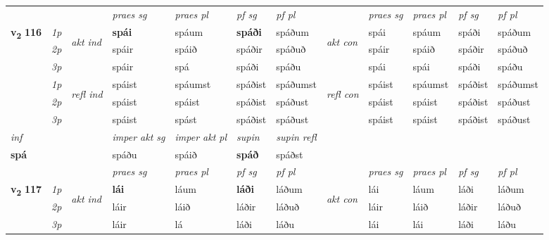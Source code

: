 \begin{longtable}[l]{X>{\footnotesize\itshape}llXXXXlXXXX}
 & &   & \textit{praes sg}  & \textit{praes pl}    & \textit{ pf sg} & \textit{pf pl} & & \textit{praes sg}  & \textit{praes pl}    & \textit{pf sg} & \textit{pf pl }  \\ \cmidrule{4-7} \cmidrule{9-12}
 \multirow{2}{*}{{{\textbf{v{\textsubscript{2}}} \Large{\textbf{116}}}}}  & 1p & \multirow{3}{*}{\begin{turn}{90}\textit{akt ind}\end{turn}} & \textbf{spái} & spáum & \textbf{spáði} & spáðum & \multirow{3}{*}{\begin{turn}{90}\textit{akt con}\end{turn}} &spái & spáum & spáði & spáðum\\*
 & 2p &  &  spáir  & spáið & spáðir & spáðuð & & spáir & spáið & spáðir & spáðuð \\*
 & 3p &  & spáir & spá & spáði & spáðu & & spái & spái& spáði & spáðu \\*
\cmidrule{4-7} \cmidrule{9-12}
 & 1p & \multirow{3}{*}{\begin{turn}{90}\textit{refl ind}\end{turn}}  & spáist & spáumst & spáðist & spáðumst & \multirow{3}{*}{\begin{turn}{90}\textit{refl con}\end{turn}}  &spáist & spáumst & spáðist & spáðumst \\*
 & 2p &  & spáist & spáist & spáðist & spáðust & &spáist & spáist & spáðist & spáðust \\*
 & 3p  & & spáist & spást & spáðist & spáðust & & spáist & spáist& spáðist & spáðust \\*
\cmidrule{4-7} \cmidrule{9-12}

   {\textit{inf}} & &  & \textit{imper akt sg} & \textit{imper akt pl}    & \textit{supin} & \textit{supin refl}  \\*
  {\textbf{spá}} & && spáðu  & spáið    &  \textbf{spáð} & spáðst  \\*

\midrule

 & &   & \textit{praes sg}  & \textit{praes pl}    & \textit{ pf sg} & \textit{pf pl} & & \textit{praes sg}  & \textit{praes pl}    & \textit{pf sg} & \textit{pf pl }  \\ \cmidrule{4-7} \cmidrule{9-12}
 \multirow{2}{*}{{{\textbf{v{\textsubscript{2}}} \Large{\textbf{117}}}}}  & 1p & \multirow{3}{*}{\begin{turn}{90}\textit{akt ind}\end{turn}} & \textbf{lái} & láum & \textbf{láði} & láðum & \multirow{3}{*}{\begin{turn}{90}\textit{akt con}\end{turn}} &lái & láum & láði & láðum\\*
 & 2p &  &  láir  & láið & láðir & láðuð & & láir & láið & láðir & láðuð \\*
 & 3p &  & láir & lá & láði & láðu & & lái & lái& láði & láðu \\*
\cmidrule{4-7} \cmidrule{9-12}


\end{longtable}
